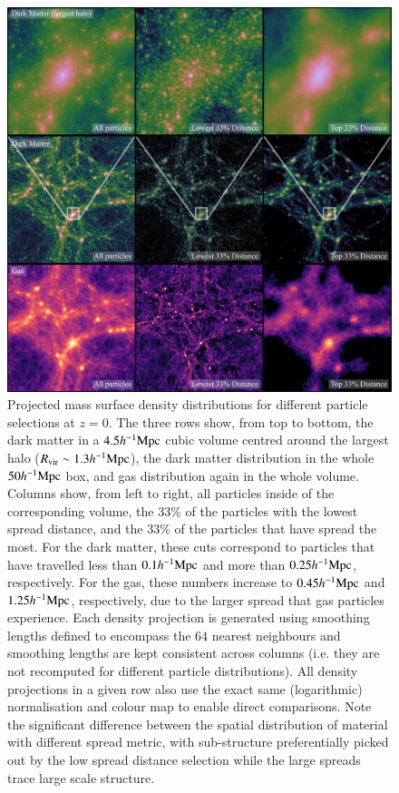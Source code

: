 \documentclass[fleqn,usenatbib]{mnras}
\newcommand{\hmpc}{h^{-1}{\rm Mpc}}
\begin{document}
\begin{figure}
    \centering
    \includegraphics[width=\textwidth]{figures/distance_figures_3.pdf}
    \caption{Projected mass surface density distributions for different
    particle selections at $z=0$. The three rows show, from top to bottom,
    the dark matter in a $4.5\hmpc{}$ cubic volume centred around the largest
    halo ($R_{\rm vir}\sim 1.3\hmpc{}$), the dark matter distribution in the
    whole $50\hmpc{}$ box, and gas distribution again in the whole volume.
    Columns show, from left to right, all particles inside of the
    corresponding volume, the 33\% of the particles with the lowest spread
    distance, and the 33\% of the particles that have spread the most. For
    the dark matter, these cuts correspond to particles that have travelled
    less than $0.1\hmpc{}$ and more than $0.25\hmpc{}$, respectively. For the
    gas, these numbers increase to $0.45\hmpc{}$ and $1.25\hmpc{}$,
    respectively, due to the larger spread that gas particles experience.
    Each density projection is generated using smoothing lengths defined to
    encompass the $64$ nearest neighbours and smoothing lengths are kept
    consistent across columns (i.e. they are not recomputed for different
    particle distributions). All density projections in a given row also use
    the exact same (logarithmic) normalisation and colour map to enable
    direct comparisons. Note the significant difference between the spatial
    distribution of material with different spread metric, with sub-structure
    preferentially picked out by the low spread distance selection while the
    large spreads trace large scale structure.
    }
    \vspace{1cm}
    \label{fig:bigdistanceimage}
\end{figure}
\end{document}
